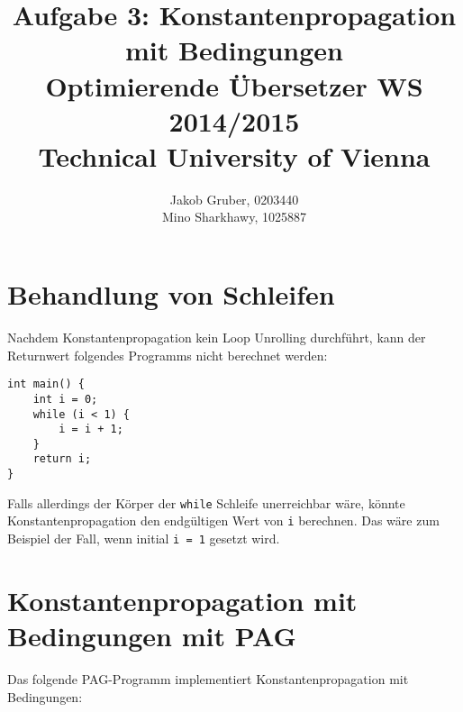 \documentclass[a4paper,10pt]{article}
\title{Aufgabe 3: Konstantenpropagation mit Bedingungen \\
       Optimierende Übersetzer WS 2014/2015 \\
       Technical University of Vienna}
\author{Jakob Gruber, 0203440 \\
        Mino Sharkhawy, 1025887}
\begin{document}
\maketitle

\section{Behandlung von Schleifen}

Nachdem Konstantenpropagation kein Loop Unrolling durchf\"uhrt, kann der Returnwert
folgendes Programms nicht berechnet werden:

\begin{lstlisting}
int main() {
    int i = 0;
    while (i < 1) {
        i = i + 1;
    }
    return i;
}
\end{lstlisting}

Falls allerdings der K\"orper der \lstinline|while| Schleife unerreichbar w\"are,
k\"onnte Konstantenpropagation den endg\"ultigen Wert von \lstinline|i| berechnen.
Das w\"are zum Beispiel der Fall, wenn initial \lstinline|i = 1| gesetzt wird.

\section{Konstantenpropagation mit Bedingungen mit PAG}

Das folgende PAG-Programm implementiert Konstantenpropagation mit Bedingungen:


\end{document}
